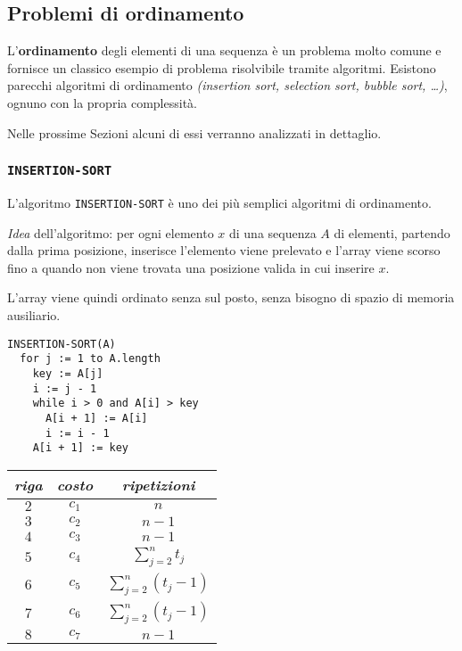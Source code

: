 \documentclass[italian, 10pt]{article}
\begin{document}
\subsection{Problemi di ordinamento}

L'\textbf{ordinamento} degli elementi di una sequenza è un problema molto comune e fornisce un classico esempio di problema risolvibile tramite algoritmi.
Esistono parecchi algoritmi di ordinamento \textit{(insertion sort, selection sort, bubble sort, \ldots)}, ognuno con la propria complessità.

\bigskip
Nelle prossime Sezioni alcuni di essi verranno analizzati in dettaglio.

\subsubsection{\texttt{INSERTION-SORT}}

L'algoritmo \texttt{INSERTION-SORT} è uno dei più semplici algoritmi di ordinamento.

\textit{Idea} dell'algoritmo:
per ogni elemento \(x\) di una sequenza \(A\) di elementi, partendo dalla prima posizione, inserisce l'elemento viene prelevato e l'array viene scorso fino a quando non viene trovata una posizione valida in cui inserire \(x\).

L'array viene quindi ordinato senza sul posto, senza bisogno di spazio di memoria ausiliario.

\begin{minipage}{0.99\textwidth}
  \bigskip
  \centering
  \begin{minipage}{0.45\textwidth}
    \centering
    \begin{lstlisting}[style=pseudocode, label={Pseudocodice dell'algoritmo di Insertion Sort}, label={lst:pseudocodice-insertion-sort}]
INSERTION-SORT(A)
  for j := 1 to A.length
    key := A[j]
    i := j - 1
    while i > 0 and A[i] > key
      A[i + 1] := A[i]
      i := i - 1
    A[i + 1] := key
    \end{lstlisting}
  \end{minipage}
  \begin{minipage}{0.45\textwidth}
    \centering
    \begin{tabular}{ccc}
      \textit{riga} & \textit{costo} & \textit{ripetizioni}     \\ \hline
      \(2\)         & \(c_1\)        & \(n\)                    \\
      \(3\)         & \(c_2\)        & \(n-1\)                  \\
      \(4\)         & \(c_3\)        & \(n-1\)                  \\
      \(5\)         & \(c_4\)        & \(\sum_{j=2}^n t_j\)     \\
      \(6\)         & \(c_5\)        & \(\sum_{j=2}^n (t_j-1)\) \\
      \(7\)         & \(c_6\)        & \(\sum_{j=2}^n (t_j-1)\) \\
      \(8\)         & \(c_7\)        & \(n-1\)                  \\
    \end{tabular}
  \end{minipage}
  \bigskip
\end{minipage}
\end{document}
